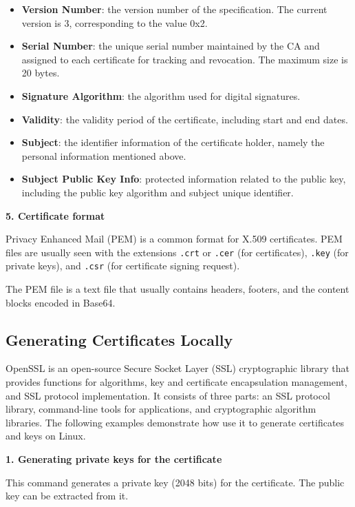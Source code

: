 \documentclass[a4paper,12pt]{book}
\begin{document}
\begin{itemize}[leftmargin=1.5em,noitemsep]
    \item \textbf{Version Number}: the version number of the specification. The current version is 3, corresponding to the value 0x2.
    \item \textbf{Serial Number}: the unique serial number maintained by the CA and assigned to each certificate for tracking and revocation. The maximum size is 20 bytes.
    \item \textbf{Signature Algorithm}: the algorithm used for digital signatures.
    \item \textbf{Validity}: the validity period of the certificate, including start and end dates.
    \item \textbf{Subject}: the identifier information of the certificate holder, namely the personal information mentioned above.
    \item \textbf{Subject Public Key Info}: protected information related to the public key, including the public key algorithm and subject unique identifier.
\end{itemize}

\textbf{5.	Certificate format}

Privacy Enhanced Mail (PEM) is a common format for X.509 certificates. PEM files are usually seen with the extensions \verb|.crt| or \verb|.cer| (for certificates), \verb|.key| (for private keys), and \verb|.csr| (for certificate signing request).

The PEM file is a text file that usually contains headers, footers, and the content blocks encoded in Base64.

\subsection{Generating Certificates Locally}
OpenSSL is an open-source Secure Socket Layer (SSL) cryptographic library that provides functions for algorithms, key and certificate encapsulation management, and SSL protocol implementation. It consists of three parts: an SSL protocol library, command-line tools for applications, and cryptographic algorithm libraries. The following examples demonstrate how use it to generate certificates and keys on Linux.

\textbf{1.	Generating private keys for the certificate}

This command generates a private key (2048 bits) for the certificate. The public key can be extracted from it.
\end{document}

